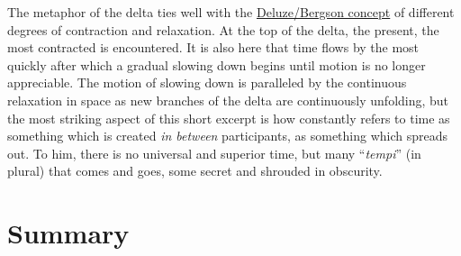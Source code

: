 The metaphor of the delta ties well with the \hyperlink{par:human-comp-inter:11}{Deluze/Bergson concept} of different degrees of contraction and relaxation. At the top of the delta, the present, the most contracted is encountered. It is also here that time flows by the most quickly after which a gradual slowing down begins until motion is no longer appreciable. The motion of slowing down is paralleled by the continuous relaxation in space as new branches of the delta are continuously unfolding, but the most striking aspect of this short excerpt is how \citeauthor{levy97} constantly refers to time as something which is created \emph{in between} participants, as something which spreads out. To him, there is no universal and superior time, but many ``\emph{tempi}'' (in plural) that comes and goes, some secret and shrouded in obscurity. 



\section{Summary}
\label{sec:summary-1}

